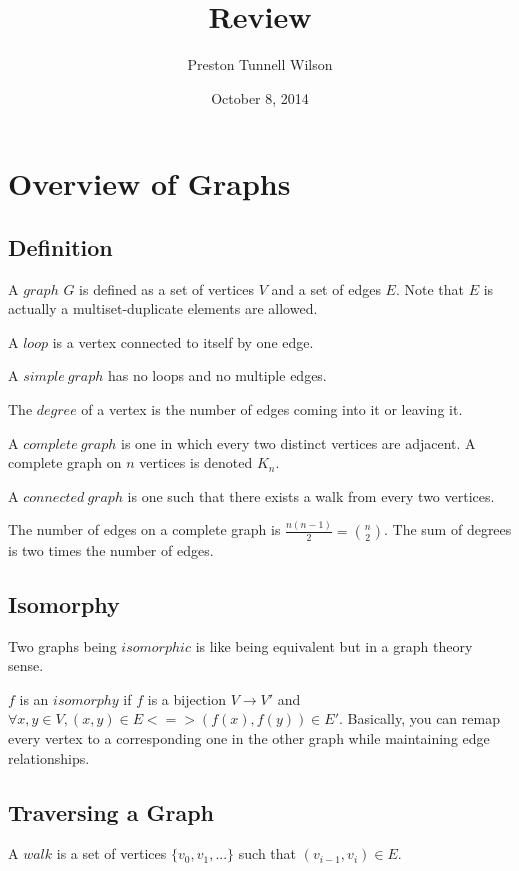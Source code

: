 \documentclass{article}
\begin{document}
\title{
Review
}

\author{
Preston Tunnell Wilson }

\date{
October 8, 2014 }

\maketitle

\section{Overview of Graphs}
\subsection{Definition}
A $graph$ $G$ is defined as a set of vertices $V$ and a set of edges $E$.
Note that $E$ is actually a multiset-duplicate elements are allowed.

A $loop$ is a vertex connected to itself by one edge.

A $simple \ graph$ has no loops and no multiple edges.

The $degree$ of a vertex is the number of edges coming into it or leaving it.

A $complete \ graph$ is one in which every two distinct vertices are adjacent.
A complete graph on $n$ vertices is denoted $K_n$.

A $connected \ graph$ is one such that there exists a walk from every two vertices.

The number of edges on a complete graph is $\frac{n(n-1)}{2} = {n \choose 2}$.
The sum of degrees is two times the number of edges.

\subsection{Isomorphy}
Two graphs being $isomorphic$ is like being equivalent but in a graph theory sense.

$f$ is an $isomorphy$ if $f$ is a bijection $V \rightarrow V'$ and $\forall x, y \in V,
(x, y) \in E <=> (f(x), f(y)) \in E'$.
Basically, you can remap every vertex to a corresponding one in the other graph
while maintaining edge relationships.

\subsection{Traversing a Graph}
A $walk$ is a set of vertices $\lbrace v_0, v_1, ... \rbrace$ such that $(v_{i-1}, v_i) \in E$.
\end{document}
